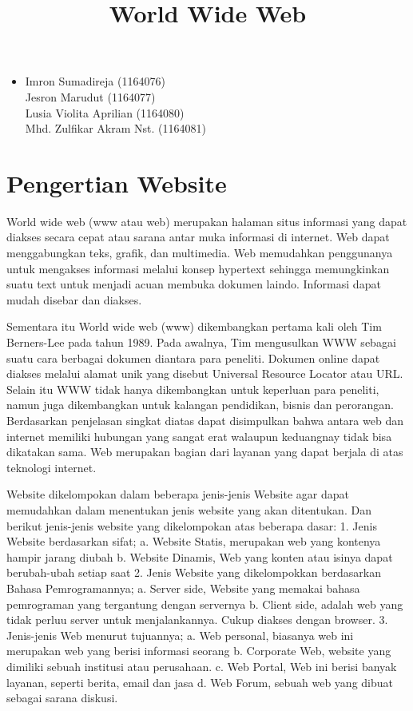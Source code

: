 \documentclass[12pt, a4paper]{article}
\begin{document}
\title{World Wide Web}
\maketitle

\begin{itemize}
\item
	Imron Sumadireja (1164076) \\
	Jesron Marudut (1164077) \\
	Lusia Violita Aprilian (1164080) \\
	Mhd. Zulfikar Akram Nst. (1164081) \\
\end{itemize}

\section{Pengertian Website}
World wide web (www atau web) merupakan halaman situs informasi yang dapat diakses secara cepat atau sarana antar muka informasi di internet. Web dapat menggabungkan teks, grafik, dan multimedia. Web memudahkan penggunanya untuk mengakses informasi melalui konsep hypertext sehingga memungkinkan  suatu text untuk menjadi acuan membuka dokumen laindo. Informasi dapat mudah disebar dan diakses.

Sementara itu World wide web (www) dikembangkan pertama kali oleh Tim Berners-Lee pada tahun 1989. Pada awalnya, Tim mengusulkan WWW sebagai suatu cara berbagai dokumen diantara para peneliti. Dokumen online dapat diakses melalui alamat unik yang disebut Universal Resource Locator atau URL. Selain itu WWW tidak hanya dikembangkan untuk keperluan para peneliti, namun juga dikembangkan untuk kalangan pendidikan, bisnis dan perorangan. Berdasarkan penjelasan singkat diatas dapat disimpulkan bahwa antara web dan internet memiliki hubungan yang sangat erat walaupun keduangnay tidak bisa dikatakan sama. Web merupakan bagian dari layanan yang dapat berjala di atas teknologi internet.

Website dikelompokan dalam beberapa jenis-jenis Website agar dapat memudahkan dalam menentukan jenis website yang akan ditentukan. Dan berikut jenis-jenis website yang dikelompokan atas beberapa dasar:
1. Jenis Website berdasarkan sifat;
	a. Website Statis, merupakan web yang kontenya hampir jarang diubah
	b. Website Dinamis, Web yang konten atau isinya dapat berubah-ubah setiap saat
2. Jenis Website yang dikelompokkan berdasarkan Bahasa Pemrogramannya;
	a. Server side, Website yang memakai bahasa pemrograman yang tergantung
		dengan servernya
	b. Client side, adalah web yang tidak perluu server untuk menjalankannya.
	   Cukup diakses dengan browser.
3. Jenis-jenis Web menurut tujuannya;
	a. Web personal, biasanya web ini merupakan web yang berisi informasi
	   seorang
	b. Corporate Web, website yang dimiliki sebuah institusi atau
	   perusahaan.
	c. Web Portal, Web ini berisi banyak layanan, seperti berita, email dan jasa
	d. Web Forum, sebuah web yang dibuat sebagai sarana diskusi.
	   
	   
\end{document}
